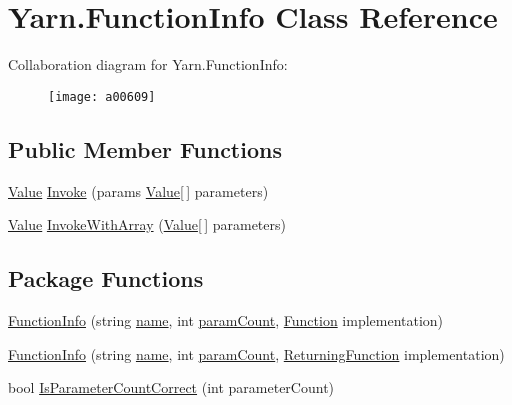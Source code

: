 \hypertarget{a00101}{\section{Yarn.\-Function\-Info Class Reference}
\label{a00101}
}


Collaboration diagram for Yarn.\-Function\-Info\-:
\nopagebreak
\begin{figure}[H]
\begin{center}
\leavevmode
\texttt{[image: a00609]}
\end{center}
\end{figure}
\subsection*{Public Member Functions}
\begin{DoxyCompactItemize}
\item 
\hyperlink{a00165}{Value} \hyperlink{a00101_ab400ac66785d7df2e3fc0f3ce3796044}{Invoke} (params \hyperlink{a00165}{Value}\mbox{[}$\,$\mbox{]} parameters)
\item 
\hyperlink{a00165}{Value} \hyperlink{a00101_a3ce11058d35232907a738de4bb094c67}{Invoke\-With\-Array} (\hyperlink{a00165}{Value}\mbox{[}$\,$\mbox{]} parameters)
\end{DoxyCompactItemize}
\subsection*{Package Functions}
\begin{DoxyCompactItemize}
\item 
\hyperlink{a00101_a93457cd0e838cb2ef59cc2a3a46ce758}{Function\-Info} (string \hyperlink{a00101_adb38e83e3c1597b553aeff14bef5bfcb}{name}, int \hyperlink{a00101_aa8527de9e4f153b05164ccaf167c3186}{param\-Count}, \hyperlink{a00048_ae0be2e5cf13d5779816102439e61ff1a}{Function} implementation)
\item 
\hyperlink{a00101_a41d97c09da25caede70cb734d18113b9}{Function\-Info} (string \hyperlink{a00101_adb38e83e3c1597b553aeff14bef5bfcb}{name}, int \hyperlink{a00101_aa8527de9e4f153b05164ccaf167c3186}{param\-Count}, \hyperlink{a00048_a5177bf74fbfe7303fac9d8236c2e514b}{Returning\-Function} implementation)
\item 
bool \hyperlink{a00101_a1ed09ff8aafa230a0d2bbc23cd6cd763}{Is\-Parameter\-Count\-Correct} (int parameter\-Count)
\end{DoxyCompactItemize}
